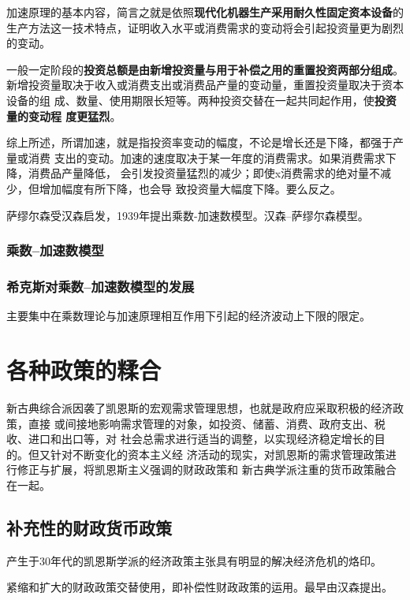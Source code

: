 加速原理的基本内容，简言之就是依照\textbf{现代化机器生产采用耐久性固定资本设备}的
生产方法这一技术特点，证明收入水平或消费需求的变动将会引起投资量更为剧烈的变动。

一般一定阶段的\textbf{投资总额是由新增投资量与用于补偿之用的重置投资两部分组成}。
新增投资量取决于收入或消费支出或消费品产量的变动量，重置投资量取决于资本设备的组
成、数量、使用期限长短等。两种投资交替在一起共同起作用，使\textbf{投资量的变动程
  度更猛烈}。

综上所述，所谓加速，就是指投资率变动的幅度，不论是增长还是下降，都强于产量或消费
支出的变动。加速的速度取决于某一年度的消费需求。如果消费需求下降，消费品产量降低，
会引发投资量猛烈的减少；即使x消费需求的绝对量不减少，但增加幅度有所下降，也会导
致投资量大幅度下降。要么反之。

萨缪尔森受汉森启发，1939年提出乘数-加速数模型。汉森--萨缪尔森模型。

\subsubsection{乘数--加速数模型}

\subsubsection{希克斯对乘数--加速数模型的发展}

主要集中在乘数理论与加速原理相互作用下引起的经济波动上下限的限定。

\section{各种政策的糅合}

新古典综合派因袭了凯恩斯的宏观需求管理思想，也就是政府应采取积极的经济政策，直接
或间接地影响需求管理的对象，如投资、储蓄、消费、政府支出、税收、进口和出口等，对
社会总需求进行适当的调整，以实现经济稳定增长的目的。但又针对不断变化的资本主义经
济活动的现实，对凯恩斯的需求管理政策进行修正与扩展，将凯恩斯主义强调的财政政策和
新古典学派注重的货币政策融合在一起。

\subsection{补充性的财政货币政策}

产生于30年代的凯恩斯学派的经济政策主张具有明显的解决经济危机的烙印。

紧缩和扩大的财政政策交替使用，即补偿性财政政策的运用。最早由汉森提出。


